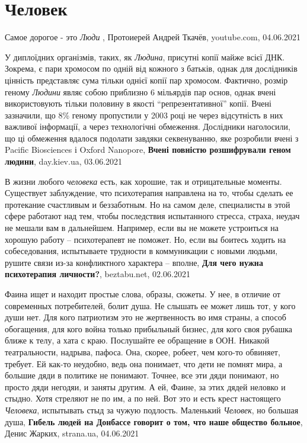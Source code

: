  
 
 
 
 
\chapter{Человек}
\label{sec:slova.chelovek}

Самое дорогое - это \emph{Люди}
, 
Протоиерей Андрей Ткачёв, youtube.com, 04.06.2021

У диплоїдних організмів, таких, як \emph{Людина}, присутні копії майже всієї
ДНК.  Зокрема, є пари хромосом по одній від кожного з батьків, однак для
дослідників цінність представляє сума тільки однієї копії пар хромосом.
Фактично, розмір геному \emph{Людини} являє собою приблизно 6 мільярдів пар
основ, однак вчені використовують тільки половину в якості
\enquote{репрезентативної} копії.  Вчені зазначили, що 8\% геному пропустили у
2003 році не через відсутність в них важливої інформації, а через технологічні
обмеження. Дослідники наголосили, що ці обмеження вдалося подолати завдяки
секвенуванню, яке розробили вчені з Pacific Biosciences і Oxford Nanopore,
\textbf{Вчені повністю розшифрували геном людини}, day.kiev.ua, 03.06.2021

В жизни любого \emph{человека} есть, как хорошие, так и отрицательные моменты.
Существует заблуждение, что психотерапия направлена на то, чтобы сделать ее
протекание счастливым и беззаботным. Но на самом деле, специалисты в этой сфере
работают над тем, чтобы последствия испытанного стресса, страха, неудач не
мешали вам в дальнейшем. Например, если вы не можете устроиться на хорошую
работу – психотерапевт не поможет. Но, если вы боитесь ходить на собеседования,
испытываете трудности в коммуникации с новыми людьми, рушите связи из-за
конфликтного характера – вполне,
\textbf{Для чего нужна психотерапия личности?}, beztabu.net, 02.06.2021

Фаина ищет и находит простые слова, образы, сюжеты. У нее, в отличие от
современных потребителей, болит душа. Не слышать ее может лишь тот, у кого души
нет. Для кого патриотизм это не жертвенность во имя страны, а способ
обогащения, для кого война только прибыльный бизнес, для кого своя рубашка
ближе к телу, а хата с краю.  Послушайте ее обращение в ООН. Никакой
театральности, надрыва, пафоса. Она, скорее, робеет, чем кого-то обвиняет,
требует. Ей как-то неудобно, ведь она понимает, что дети не помнят мира, а
большие дяди в политике не понимают. Точнее, все эти дяди понимают, но просто
дяди негодяи, и заняты другим. А ей, Фаине, за этих дядей неловко и стыдно.
Хотя стреляют не по им, а по ней. Вот это и есть крест настоящего
\emph{Человека}, испытывать стыд за чужую подлость. Маленький \emph{Человек},
но большая душа,
\textbf{Гибель людей на Донбассе говорит о том, что наше общество больное},
Денис Жарких, strana.ua, 04.06.2021

